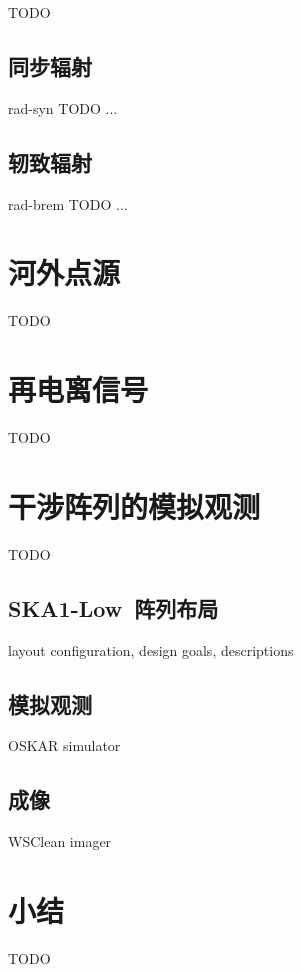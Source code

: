 TODO

\subsection{同步辐射}

\ac{rad-syn} TODO ...

\subsection{轫致辐射}

\ac{rad-brem} TODO ...


\section{河外点源}

TODO


\section{再电离信号}

TODO


\section{干涉阵列的模拟观测}

TODO

\subsection{SKA1-Low~阵列布局}

layout configuration, design goals, descriptions

\subsection{模拟观测}

OSKAR simulator

\subsection{成像}
\label{ssec:imaging}

WSClean imager


\section{小结}

TODO



